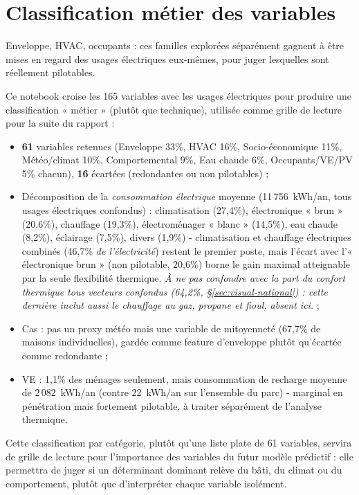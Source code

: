 \section{Classification métier des variables}
\label{sec:classification-metier}
Enveloppe, HVAC, occupants : ces familles explorées séparément gagnent à être mises en regard des
usages électriques eux-mêmes, pour juger lesquelles sont réellement pilotables.
\begin{resultbox}
Ce notebook croise les 165 variables  avec les usages électriques
 pour produire une classification « métier » (plutôt que technique),
utilisée comme grille de lecture pour la suite du rapport :
\begin{itemize}
  \item \textbf{61} variables retenues (Enveloppe 33\%, HVAC 16\%, Socio-économique 11\%,
  Météo/climat 10\%, Comportemental 9\%, Eau chaude 6\%, Occupants/VE/PV 5\% chacun),
  \textbf{16} écartées (redondantes ou non pilotables) ;
  \item Décomposition de la \emph{consommation électrique} moyenne (11\,756~kWh/an, tous usages
  électriques confondus) : climatisation (27,4\%), électronique « brun » (20,6\%), chauffage
  (19,3\%), électroménager « blanc » (14,5\%), eau chaude (8,2\%), éclairage (7,5\%), divers
  (1,9\%) - climatisation et chauffage électriques combinés (46,7\% \emph{de l'électricité})
  restent le premier poste, mais l'écart avec l'« électronique brun » (non pilotable, 20,6\%)
  borne le gain maximal atteignable par la seule flexibilité thermique. \emph{À ne pas confondre
  avec la part du confort thermique tous vecteurs confondus (64,2\%, \S\ref{sec:visual-national})
  : cette dernière inclut aussi le chauffage au gaz, propane et fioul, absent ici.} ;
  \item Cas  : pas un proxy météo mais une variable de mitoyenneté (67,7\%
  de maisons individuelles), gardée comme feature d'enveloppe plutôt qu'écartée comme
  redondante ;
  \item VE : 1,1\% des ménages seulement, mais consommation de recharge moyenne de
  2\,082~kWh/an (contre 22~kWh/an sur l'ensemble du parc) - marginal en pénétration mais
  fortement pilotable, à traiter séparément de l'analyse thermique.
\end{itemize}
Cette classification par catégorie, plutôt qu'une liste plate de 61 variables, servira de grille
de lecture pour l'importance des variables du futur modèle prédictif : elle permettra de juger
si un déterminant dominant relève du bâti, du climat ou du comportement, plutôt que d'interpréter
chaque variable isolément.
\end{resultbox}

